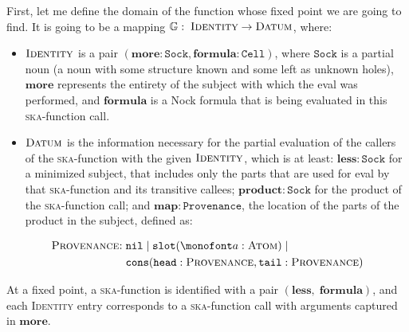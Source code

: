 \documentclass[twoside]{article}
\begin{document}
First, let me define the domain of the function whose fixed point we are going to find. It is going to be a mapping $\mathbb{G}: \; \textsc{Identity} \rightarrow \textsc{Datum}$, where:
\begin{itemize}
  \item  $\textsc{Identity}$ is a pair \mbox{$(\mathbf{more}: \mathtt{Sock}, \mathbf{formula}: \mathtt{Cell})$,} where $\mathtt{Sock}$ is a partial noun (a noun with some structure known and some left as unknown holes), $\mathbf{more}$ represents the entirety of the subject with which the eval was performed, and $\mathbf{formula}$ is a Nock formula that is being evaluated in this \textsc{ska}-function call.
  \item  $\textsc{Datum}$ is the information necessary for the partial evaluation of the callers of the \textsc{ska}-function with the given $\textsc{Identity}$, which is at least: $\mathbf{less}: \mathtt{Sock}$ for a minimized subject, that includes only the parts that are used for eval by that \textsc{ska}-function and its transitive callees; $\mathbf{product}: \mathtt{Sock}$ for the product of the \textsc{ska}-function call; and $\mathbf{map}: \mathtt{Provenance}$, the location of the parts of the product in the subject, defined as:
\end{itemize}

\begin{align*}
\textsc{Provenance:} \;&\mathtt{nil} \;|\; \mathtt{slot}(\texttt{a}: \textsc{Atom}) \;|\\
& \mathtt{cons}(\mathtt{head}: \textsc{Provenance}, \mathtt{tail}: \textsc{Provenance})
\end{align*}

At a fixed point, a \textsc{ska}-function is identified with a pair $(\mathbf{less},\;\mathbf{formula})$, and each \textsc{Identity} entry corresponds to a \textsc{ska}-function call with arguments captured in $\mathbf{more}$.
\end{document}
